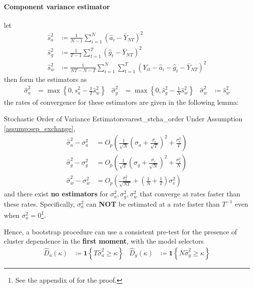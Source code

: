 \documentclass[twoside]{article}
\begin{document}
\paragraph*{Component variance estimator} let 
\begin{align*}
    \hat{s}^2_a &\coloneq \frac{1}{N-1}\sum^N_{i=1} \left(\hat{a}_i - \bar{Y}_{NT}\right)^2 \\
    \hat{s}^2_g &\coloneq \frac{1}{T-1}\sum^T_{t=1} \left(\hat{g}_t - \bar{Y}_{NT}\right)^2 \\
    \hat{s}^2_w &\coloneq \frac{1}{NT-N-T} \sum^N_{i=1}\sum^T_{t=1} \left(Y_{it}-\hat{a}_i-\hat{g}_t -\bar{Y}_{NT}\right)^2
\end{align*}
then form the estimators as 
\begin{align}
    \hat{\sigma}^2_a &= \max \left\{0,\hat{s}_a^2 -\frac{1}{T}\hat{s}^2_w\right\} & \hat{\sigma}_g^2 &=\max \left\{0,\hat{s}^2_g -\frac{1}{N}\hat{s}_w^2\right\} & \hat{\sigma}^2_w&\coloneq \hat{s}^2_w
\end{align}
the rates of convergence for these estimators are given in the following lemma:
\begin{lemma}{Stochastic Order of Variance Estimators}{varest_stcha_order}
    Under Assumption \ref{assump:sep_exchange},
    \begin{align*}
        \hat{\sigma}^2_a - \sigma^2_a &= O_p \left(\frac{1}{\sqrt{N}}\left(\sigma_a + \frac{\sigma_e}{\sqrt{T}}\right)^2 + \frac{\sigma^2_v}{T}\right) \\
        \hat{\sigma}^2_g - \sigma^2_g &= O_p \left(\frac{1}{\sqrt{T}}\left(\sigma_g + \frac{\sigma_e}{\sqrt{N}}\right)^2 + \frac{\sigma^2_v}{N}\right) \\
        \hat{\sigma}^2_w - \sigma^2_w &= O_p \left(\frac{\sigma^2_e}{\sqrt{NT}} + \left(\frac{1}{N} + \frac{1}{T}\right)\sigma^2_v \right)
    \end{align*}
    and there exist \textbf{no estimators} for $\sigma^2_a,\sigma^2_g,\sigma^2_w$ that converge at rates faster than these rates. Specifically, $\sigma^2_a$ can \textbf{NOT} be estimated at a rate faster than $T^{-1}$ even when $\sigma^2_a=0$\footnote{See the appendix of \citet{menzel2021bootstrap} for the proof.}.
\end{lemma}
Hence, a bootstrap procedure can use a consistent pre-test for the presence of cluster dependence in the \textbf{first moment}, with the model selectors 
\begin{align*}
    \hat{D}_a(\kappa) &\coloneq \mathbf{1} \left\{T\hat{\sigma}_a^2 \geq \kappa \right\} & \hat{D}_g(\kappa) &\coloneq \mathbf{1}\left\{N\hat{\sigma}_g^2 \geq \kappa \right\}
\end{align*}
\end{document}
